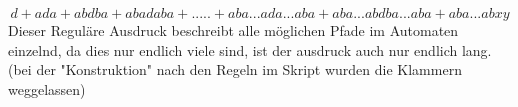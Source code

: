 \[d+ada+abdba+abadaba+.....+aba...ada...aba+aba...abdba...aba+aba...abxy\]
Dieser Reguläre Ausdruck beschreibt alle möglichen Pfade im Automaten einzelnd, da dies nur endlich viele sind, ist der ausdruck auch nur endlich lang.
(bei der "{}Konstruktion"{} nach den Regeln im Skript wurden die Klammern weggelassen)
